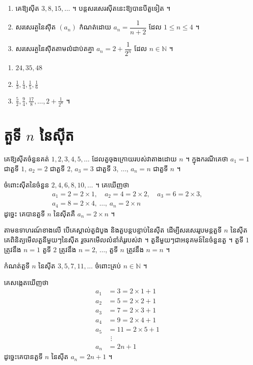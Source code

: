 \begin{pro}
\begin{enumerate}[a]
  \item គេឱ្យស៊ីត $3, 8, 15, \ldots$ ។ បន្តសរសេរស៊ីតនេះឱ្យបានបីតួទៀត ។
  \item សរសេរតួនៃស៊ីត $(a_n)$ កំណត់ដោយ $a_n = \dfrac{1}{n+2}$ ដែល $1 \le n \le 4$ ។
  \item សរសេរតួនៃស៊ីតតាមលំដាប់តគ្នា $a_n = 2 + \dfrac{1}{2^n}$ ដែល $n \in \mathbb{N}$ ។
\end{enumerate}
\ans
\begin{enumerate}[a]
  \item $24, 35, 48$
  \item $\frac{1}{3}, \frac{1}{4}, \frac{1}{5}, \frac{1}{6}$
  \item $\frac{5}{2}, \frac{9}{4}, \frac{17}{8}, \ldots, 2 + \frac{1}{2^n}$ ។
\end{enumerate}
\end{pro}

\section{តួទី \texorpdfstring{$n$}{n} នៃស៊ីត}

\begin{example}[ឧទាហរណ៍ ១]
គេឱ្យស៊ីតចំនួនគត់ $1, 2, 3, 4, 5, \ldots$ ដែលតួចុងក្រោយរបស់វាតាងដោយ $n$ ។ ក្នុងករណីគេថា $a_1 = 1$ ជាតួទី $1$, $a_2 = 2$ ជាតួទី $2$, $a_3 = 3$ ជាតួទី $3$, $\ldots$, $a_n = n$ ជាតួទី $n$ ។
\end{example}

\begin{example}[ឧទាហរណ៍ ២]
ចំពោះស៊ីតនៃចំនួន $2, 4, 6, 8, 10, \ldots$ ។ គេឃើញថា
\[
\begin{gathered} a_1 = 2 = 2 \times 1,\quad a_2 = 4 = 2 \times 2,\quad a_3 = 6 = 2 \times 3,\\ a_4 = 8 = 2 \times 4,\ \ldots,\ a_n = 2 \times n \end{gathered}
\]
ដូច្នេះ គេបានតួទី $n$ នៃស៊ីតគឺ $a_n = 2 \times n$ ។
\end{example}

តាមឧទាហរណ៍ខាងលើ បើគេស្គាល់តួដំបូង និងតួបន្តបន្ទាប់នៃស៊ីត ដើម្បីសរសេររូបមន្តតួទី $n$ នៃស៊ីតគេពិនិត្យមើលតួនីមួយៗនៃស៊ីត រួចរកមើលលំនាំគំរូរបស់វា ។ តួនីមួយៗជាអនុគមន៍នៃចំនួនតួ ។ តួទី $1$ ត្រូវនឹង $n = 1$ តួទី $2$ ត្រូវនឹង $n = 2$, $\ldots$, តួទី $n$ ត្រូវនឹង $n = n$ ។

\begin{example}[លំហាត់គំរូ ១]
កំណត់តួទី $n$ នៃស៊ីត $3, 5, 7, 11, \ldots$ ចំពោះគ្រប់ $n \in \mathbb{N}$ ។
\end{example}
\ans
គេសង្កេតឃើញថា
\[
\begin{aligned}
a_1 &= 3 = 2 \times 1 + 1\\
a_2 &= 5 = 2 \times 2 + 1\\
a_3 &= 7 = 2 \times 3 + 1\\
a_4 &= 9 = 2 \times 4 + 1\\
a_5 &= 11 = 2 \times 5 + 1\\
&\ \,\vdots\\
a_n &= 2n + 1
\end{aligned}
\]
ដូច្នេះគេបានតួទី $n$ នៃស៊ីត $a_n = 2n + 1$ ។


